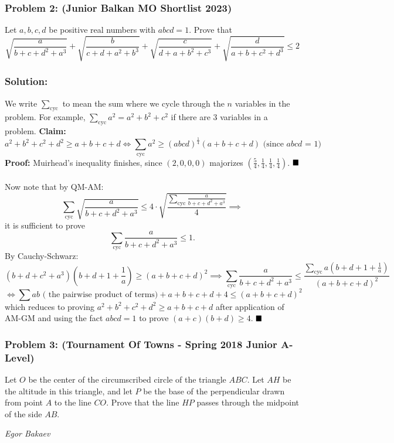 \documentclass[fontsize=9pt]{scrartcl}
\begin{document}
\subsubsection*{Problem 2: (Junior Balkan MO Shortlist 2023)} 
Let $a,b,c,d$ be positive real numbers with $abcd=1$. Prove that
\[ \sqrt{\frac{a}{b+c+d^2+a^3}}+\sqrt{\frac{b}{c+d+a^2+b^3}}+\sqrt{\frac{c}{d+a+b^2+c^3}}+\sqrt{\frac{d}{a+b+c^2+d^3}} \leq 2 \]
\subsubsection*{Solution:} We write $\sum_{\text{cyc}}$ to mean the sum where we cycle through the $n$ variables in the problem. \newline
For example, $\sum_{\text{cyc}} a^2 = a^2 + b^2+c^2$ if there are $3$ variables in a problem. \newline
\textbf{Claim:} \[a^2+b^2+c^2+d^2 \ge a+b+c+d \iff \sum_{\text{cyc}}a^2 \ge (abcd)^{\frac14} (a+b+c+d) \text{ (since $abcd$ = 1)}\]
\textbf{Proof:}
Muirhead's inequality finishes, since $(2,0,0,0)$ majorizes $(\frac 54, \frac 14, \frac 14, \frac 14)$. $\hfill \blacksquare$ ~\\
Now note that by QM-AM:
\[\sum_{\text{cyc}} \sqrt{\frac{a}{b+c+d^2+a^3}} \le 4 \cdot \sqrt{\frac{\sum_{\text{cyc}}\frac{a}{b+c+d^2+a^3}}{4}} \implies\]
it is sufficient to prove \[\sum_{\text{cyc}}\frac{a}{b+c+d^2+a^3} \le 1.\]
By Cauchy-Schwarz: \[(b+d+c^2+a^3) \left(b+d+1+\frac 1a \right) \ge (a+b+c+d)^2 \implies \sum_{\text{cyc}}\frac{a}{b+c+d^2+a^3} \le \frac{\sum_{\text{cyc}} a \left(b+d+1+\frac 1a \right)}{(a+b+c+d)^2}\]
\[ \iff \sum ab \text{ ( the pairwise product of terms)} + a+b+c+d+4 \le (a+b+c+d)^2\]
which reduces to proving $a^2+b^2+c^2+d^2 \ge a+b+c+d$ after application of AM-GM and using the fact $abcd = 1$
to prove $(a+c)(b+d) \ge 4$. $\hfill \blacksquare$
\subsubsection*{Problem 3: (Tournament Of Towns - Spring 2018 Junior A-Level)}
	Let $O$ be the center of the circumscribed circle of the triangle $ABC$. Let $AH$ be the altitude in this triangle, 
    and let $P$ be the base of the perpendicular drawn from point $A$ to the line $CO$. 
    Prove that the line $HP$ passes through the midpoint of the side $AB$. 
    \begin{flushright}
        { \emph{Egor Bakaev} }
    \end{flushright}
    
\end{document}
